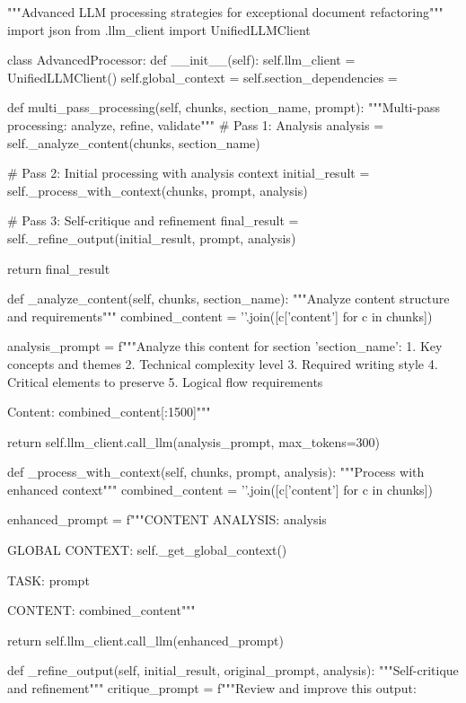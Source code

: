 """Advanced LLM processing strategies for exceptional document refactoring"""
import json
from .llm_client import UnifiedLLMClient

class AdvancedProcessor:
    def __init__(self):
        self.llm_client = UnifiedLLMClient()
        self.global_context = {}
        self.section_dependencies = {}
        
    def multi_pass_processing(self, chunks, section_name, prompt):
        """Multi-pass processing: analyze, refine, validate"""
        # Pass 1: Analysis
        analysis = self._analyze_content(chunks, section_name)
        
        # Pass 2: Initial processing with analysis context
        initial_result = self._process_with_context(chunks, prompt, analysis)
        
        # Pass 3: Self-critique and refinement
        final_result = self._refine_output(initial_result, prompt, analysis)
        
        return final_result
    
    def _analyze_content(self, chunks, section_name):
        """Analyze content structure and requirements"""
        combined_content = '\n'.join([c['content'] for c in chunks])
        
        analysis_prompt = f"""Analyze this content for section '{section_name}':
1. Key concepts and themes
2. Technical complexity level
3. Required writing style
4. Critical elements to preserve
5. Logical flow requirements

Content: {combined_content[:1500]}"""
        
        return self.llm_client.call_llm(analysis_prompt, max_tokens=300)
    
    def _process_with_context(self, chunks, prompt, analysis):
        """Process with enhanced context"""
        combined_content = '\n'.join([c['content'] for c in chunks])
        
        enhanced_prompt = f"""CONTENT ANALYSIS: {analysis}

GLOBAL CONTEXT: {self._get_global_context()}

TASK: {prompt}

CONTENT: {combined_content}"""
        
        return self.llm_client.call_llm(enhanced_prompt)
    
    def _refine_output(self, initial_result, original_prompt, analysis):
        """Self-critique and refinement"""
        critique_prompt = f"""Review and improve this output:

